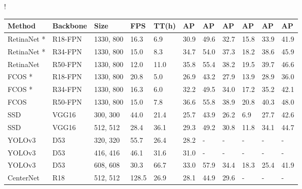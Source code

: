 \documentclass[letterpaper]{article} \usepackage{aaai20}  \usepackage{times}  \usepackage{helvet} \usepackage{courier}  \usepackage[hyphens]{url}  \usepackage{graphicx} \urlstyle{rm} \def\UrlFont{\rm}  \usepackage{graphicx}  \frenchspacing  \setlength{\pdfpagewidth}{8.5in}  \setlength{\pdfpageheight}{11in}  \usepackage{subcaption}
\begin{document}
\begin{table*}[tbp]
\centering
\resizebox{1.7\columnwidth}!{
\begin{tabular}{lllllllllll}
\Xhline{2\arrayrulewidth}
Method             & Backbone       & Size    & FPS          & TT(h) & AP   & AP & AP & AP  & AP  & AP  \\
\hline
RetinaNet \cite{lin2017focal} *         & R18-FPN  & 1330, 800 & 16.3            &  6.9              & 30.9 & 49.6 & 32.7 & 15.8 & 33.9 & 41.9 \\
RetinaNet \cite{lin2017focal} *         & R34-FPN  & 1330, 800 & 15.0            &  8.3              & 34.7 & 54.0 & 37.3 & 18.2 & 38.6 & 45.9 \\
RetinaNet \cite{lin2017focal}          & R50-FPN  & 1330, 800 & 12.0            & 11.0           & 35.8 & 55.4 & 38.2 & 19.5 & 39.7 & 46.6 \\
FCOS \cite{DBLP:journals/corr/abs-1904-01355} *          & R18-FPN  & 1330, 800 & 20.8            & 5.0            & 26.9 & 43.2 & 27.9 & 13.9 & 28.9 & 36.0 \\
FCOS \cite{DBLP:journals/corr/abs-1904-01355} *              & R34-FPN  & 1330, 800 & 16.3            & 6.0            & 32.2 & 49.5 & 34.0 & 17.2 & 35.2 & 42.1 \\
FCOS \cite{DBLP:journals/corr/abs-1904-01355}               & R50-FPN  & 1330, 800 & 15.0            & 7.8            & 36.6 & 55.8 & 38.9 & 20.8 & 40.3 & 48.0 \\
\hline
SSD \cite{liu2016ssd}               & VGG16    & 300, 300  & 44.0            & 21.4           & 25.7 & 43.9 & 26.2 & 6.9  & 27.7 & 42.6 \\
SSD \cite{liu2016ssd}               & VGG16    & 512, 512  & 28.4            & 36.1           & 29.3 & 49.2 & 30.8 & 11.8 & 34.1 & 44.7 \\
YOLOv3 \cite{redmon2018yolov3}            & D53      & 320, 320  & 55.7            & 26.4           & 28.2 & -    & -    & -    & -    & -    \\
YOLOv3 \cite{redmon2018yolov3}             & D53      & 416, 416  & 46.1            & 31.6           & 31.0 & -    & -    & -    & -    & -    \\
YOLOv3 \cite{redmon2018yolov3}             & D53      & 608, 608  & 30.3            & 66.7           & 33.0 & 57.9 & 34.4 & 18.3 & 25.4 & 41.9 \\
CenterNet \cite{DBLP:journals/corr/abs-1904-07850}         & R18      & 512, 512  & 128.5           & 26.9           & 28.1 & 44.9 & 29.6 & -    & -    & -    \\

\end{tabular}}
\end{table*}
\end{document}
